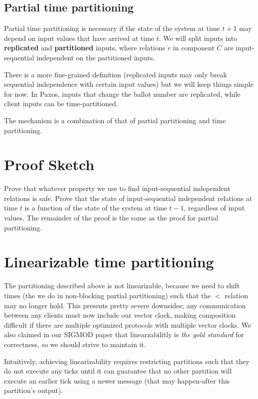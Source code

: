 \documentclass{article}
\begin{document}
\subsection{Partial time partitioning}
Partial time partitioning is necessary if the state of the system at time $t+1$ may depend on input values that have arrived at time $t$.
We will split inputs into \textbf{replicated} and \textbf{partitioned} inputs, where relations $r$ in component $C$ are input-sequential independent on the partitioned inputs.

There is a more fine-grained definition (replicated inputs may only break sequential independence with certain input values) but we will keep things simple for now.
In Paxos, inputs that change the ballot number are replicated, while client inputs can be time-partitioned.

The mechanism is a combination of that of partial partitioning and time partitioning.


\section{Proof Sketch}
Prove that whatever property we use to find input-sequential independent relations is safe.
Prove that the state of input-sequential independent relations at time $t$ is a function of the state of the system at time $t-1$, regardless of input values.
The remainder of the proof is the same as the proof for partial partitioning.


\section{Linearizable time partitioning}
The partitioning described above is not linearizable, because we need to shift times (the we do in non-blocking partial partitioning) such that the $<$ relation may no longer hold.
This presents pretty severe downsides; any communication between any clients must now include our vector clock, making composition difficult if there are multiple optimized protocols with multiple vector clocks.
We also claimed in our SIGMOD paper that linearzabilitly is \emph{the gold standard} for correctness, so we should strive to maintain it.

Intuitively, achieving linearizability requires restricting partitions such that they do not execute any ticks until it can guarantee that no other partition will execute an earlier tick using a newer message (that may happen-after this partition's output).
\end{document}
